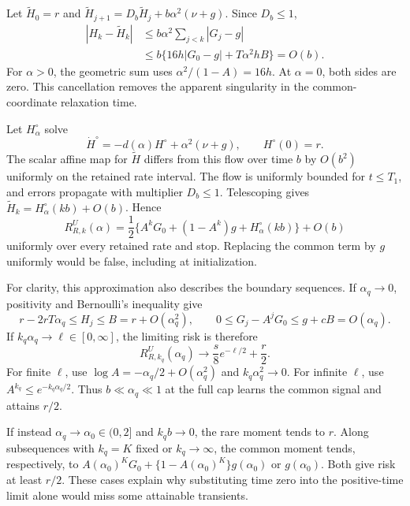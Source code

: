 Let $\widetilde H_0=r$ and
$\widetilde H_{j+1}=D_b\widetilde H_j+b\alpha^2(\nu+g)$. Since $D_b\leq1$,
\begin{align*}
  |H_k-\widetilde H_k|
  &\leq b\alpha^2\sum_{j<k}|G_j-g|\\
  &\leq b\{16h|G_0-g|+T\alpha^2hB\}=O(b).
\end{align*}
For $\alpha>0$, the geometric sum uses
$\alpha^2/(1-A)=16h$. At $\alpha=0$, both sides are zero. This cancellation
removes the apparent singularity in the common-coordinate relaxation time.

Let $H^\circ_\alpha$ solve
\[
  \dot H^\circ=-d(\alpha)H^\circ+\alpha^2(\nu+g),
  \qquad H^\circ(0)=r.
\]
The scalar affine map for $\widetilde H$ differs from this flow over time $b$
by $O(b^2)$ uniformly on the retained rate interval. The flow is uniformly
bounded for $t\leq T_1$, and errors propagate with multiplier $D_b\leq1$.
Telescoping gives $\widetilde H_k=H^\circ_\alpha(kb)+O(b)$. Hence
\begin{equation}
  R^U_{R,k}(\alpha)
    =\frac12\{A^kG_0+(1-A^k)g+H^\circ_\alpha(kb)\}+O(b)
    \label{eq:limit-u-uniform}
\end{equation}
uniformly over every retained rate and stop. Replacing the common term by $g$
uniformly would be false, including at initialization.

For clarity, this approximation also describes the boundary sequences. If
$\alpha_q\to0$, positivity and Bernoulli's inequality give
\[
  r-2rT\alpha_q\leq H_j\leq B=r+O(\alpha_q^2),\qquad
  0\leq G_j-A^jG_0\leq g+cB=O(\alpha_q).
\]
If $k_q\alpha_q\to\ell\in[0,\infty]$, the limiting risk is therefore
\begin{equation}
  R^U_{R,k_q}(\alpha_q)\longrightarrow
    \frac{s}{8}e^{-\ell/2}+\frac r2.
  \label{eq:limit-u-transient}
\end{equation}
For finite $\ell$, use $\log A=-\alpha_q/2+O(\alpha_q^2)$ and
$k_q\alpha_q^2\to0$. For infinite $\ell$, use
$A^{k_q}\leq e^{-k_q\alpha_q/2}$. Thus $b\ll\alpha_q\ll1$ at the full
cap learns the common signal and attains $r/2$.

If instead $\alpha_q\to\alpha_0\in(0,2]$ and $k_qb\to0$, the rare moment
tends to $r$. Along subsequences with $k_q=K$ fixed or $k_q\to\infty$, the
common moment tends, respectively, to
$A(\alpha_0)^KG_0+\{1-A(\alpha_0)^K\}g(\alpha_0)$ or $g(\alpha_0)$.
Both give risk at least $r/2$. These cases explain why substituting time zero
into the positive-time limit alone would miss some attainable transients.

